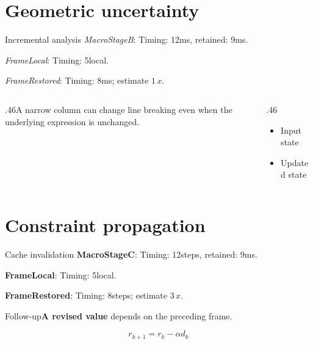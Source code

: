 \documentclass[11pt,aspectratio=43]{beamer}
\newcommand{\fuzzlayerA}[1]{\textit{#1}}
\newcommand{\fuzzlayerB}[1]{\fuzzlayerA{#1}}
\newcommand{\fuzzlayerC}[1]{\fuzzlayerB{#1}}
\newcommand{\fuzzterm}[1]{\fuzzlayerC{#1}}
\newcommand{\fuzzpair}[2]{\fuzzterm{#1}: #2}
\newcommand{\fuzzunit}{ms}
\let\fuzzoriginalunit\fuzzunit
\newcommand{\fuzzcoefficient}{1}
\newcommand{\fuzzscale}[2][\fuzzcoefficient]{#1\,#2}
\begin{document}
\section{Geometric uncertainty}
\begin{frame}[t]{Incremental analysis}
\fuzzpair{MacroStageB}{Timing: 12\fuzzunit, retained: 9\fuzzoriginalunit.}\par
{\renewcommand{\fuzzunit}{local}\fuzzpair{FrameLocal}{Timing: 5\fuzzunit.}\par}
\fuzzpair{FrameRestored}{Timing: 8\fuzzunit; estimate $\fuzzscale{x}$.}\par
\begin{columns}[T]\begin{column}{.46\textwidth}A narrow column can change line breaking even when the underlying expression is unchanged.\end{column}\begin{column}{.46\textwidth}\begin{itemize}\item Input state\item Updated state\end{itemize}\end{column}\end{columns}
\end{frame}
\renewcommand{\fuzzunit}{steps}
\renewcommand{\fuzzcoefficient}{3}
\renewcommand{\fuzzterm}[1]{{\textbf{#1}}}
\section{Constraint propagation}
\begin{frame}[t]{Cache invalidation}
\fuzzpair{MacroStageC}{Timing: 12\fuzzunit, retained: 9\fuzzoriginalunit.}\par
{\renewcommand{\fuzzunit}{local}\fuzzpair{FrameLocal}{Timing: 5\fuzzunit.}\par}
\fuzzpair{FrameRestored}{Timing: 8\fuzzunit; estimate $\fuzzscale{x}$.}\par
\begin{block}{Follow-up}\fuzzterm{A revised value} depends on the preceding frame.\end{block}
\[r_{k+1}=r_k-\alpha d_k\]
\end{frame}
\renewcommand{\fuzzunit}{us}
\renewcommand{\fuzzcoefficient}{4}
\renewcommand{\fuzzterm}[1]{{\textbf{#1}}}
\end{document}
